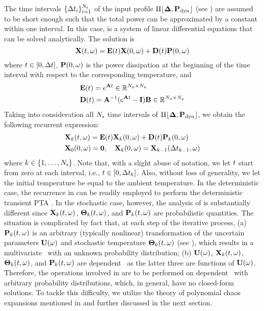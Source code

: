 The time intervals $\{ \Delta t_i \}_{i = 1}^{N_\text{s}}$ of the input profile $\profPdyn$ (see ) are assumed to be short enough such that the total power can be approximated by a constant within one interval. In this case,  is a system of linear differential equations that can be solved analytically. The solution is
\begin{equation} \elabel{ode-solution}
  \vX(\t, \o) = \mE(\t) \vX(0, \o) + \mD(\t) \vP(0, \o)
\end{equation}
where $t \in [0, \Delta t]$, $\mathbf{P}(0, \omega)$ is the power dissipation at the beginning of the time interval with respect to the corresponding temperature, and
\begin{align*}
  & \mE(\t) = e^{\mA \t} \in \real^{\nodes \times \nodes} \\
  & \mD(\t) = \mA^{-1} (e^{\mA \t} - \mI) \mB \in \real^{\nodes \times \cores}
\end{align*}
Taking into consideration all $N_\text{s}$ time intervals of $\profPdyn$, we obtain the following recurrent expression:
\begin{align}
  & \vX_k(\t, \o) = \mE(\t) \vX_k(0, \o) + \mD(\t) \vP_k(0, \o) \elabel{recurrence} \\
  & \vX_0(0, \o) = \vZero, \hspace{1em} \vX_k(0, \o) = \vX_{k - 1}(\dt_{k - 1}, \o) \nonumber
\end{align}
where $k \in \{ 1, \dotsc, N_\text{s} \}$. Note that, with a slight abuse of notation, we let $t$ start from zero at each interval, i.e., $t \in [ 0, \Delta t_k ]$. Also, without loss of generality, we let the initial temperature be equal to the ambient temperature. In the deterministic case, the recurrence in  can be readily employed to perform the deterministic transient PTA \cite{thiele2011, ukhov2012}. In the stochastic case, however, the analysis of  is substantially different since $\mathbf{X}_k(t, \omega)$, ${\boldsymbol\Theta}_k(t, \omega)$, and $\mathbf{P}_k(t, \omega)$ are probabilistic quantities. The situation is complicated by fact that, at each step of the iterative process, (a) $\mathbf{P}_k(t, \omega)$ is an arbitrary (typically nonlinear) transformation of the uncertain parameters $\mathbf{U}(\omega)$ and stochastic temperature ${\boldsymbol\Theta}_k(t, \omega)$ (see ), which results in a multivariate \rv\ with an unknown probability distribution; (b) $\mathbf{U}(\omega)$, $\mathbf{X}_k(t, \omega)$, ${\boldsymbol\Theta}_k(t, \omega)$, and $\mathbf{P}_k(t, \omega)$ are dependent \rvs\ as the latter three are functions of $\mathbf{U}(\omega)$. Therefore, the operations involved in  are to be performed on dependent \rvs\ with arbitrary probability distributions, which, in general, have no closed-form solutions. To tackle this difficulty, we utilize the theory of polynomial chaos expansions mentioned in  and further discussed in the next section.
